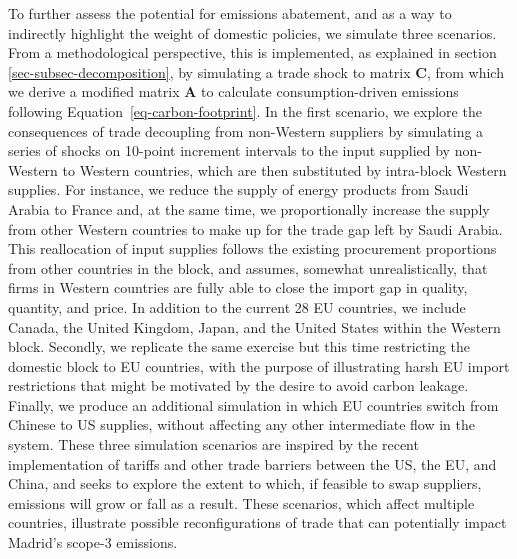 \documentclass[
  10pt,
  twocolumn]{aft}
\begin{document}
To further assess the potential for emissions abatement, and as a way to
indirectly highlight the weight of domestic policies, we simulate three
scenarios. From a methodological perspective, this is implemented, as
explained in section \ref{sec-subsec-decomposition}, by simulating a
trade shock to matrix \(\mathbf{C}\), from which we derive a modified
matrix \(\mathbf{A}\) to calculate consumption-driven emissions
following Equation~\ref{eq-carbon-footprint}. In the first scenario, we
explore the consequences of trade decoupling from non-Western suppliers
by simulating a series of shocks on 10-point increment intervals to the
input supplied by non-Western to Western countries, which are then
substituted by intra-block Western supplies. For instance, we reduce the
supply of energy products from Saudi Arabia to France and, at the same
time, we proportionally increase the supply from other Western countries
to make up for the trade gap left by Saudi Arabia. This reallocation of
input supplies follows the existing procurement proportions from other
countries in the block, and assumes, somewhat unrealistically, that
firms in Western countries are fully able to close the import gap in
quality, quantity, and price. In addition to the current 28 EU
countries, we include Canada, the United Kingdom, Japan, and the United
States within the Western block. Secondly, we replicate the same
exercise but this time restricting the domestic block to EU countries,
with the purpose of illustrating harsh EU import restrictions that might
be motivated by the desire to avoid carbon leakage. Finally, we produce
an additional simulation in which EU countries switch from Chinese to US
supplies, without affecting any other intermediate flow in the system.
These three simulation scenarios are inspired by the recent
implementation of tariffs and other trade barriers between the US, the
EU, and China, and seeks to explore the extent to which, if feasible to
swap suppliers, emissions will grow or fall as a result. These
scenarios, which affect multiple countries, illustrate possible
reconfigurations of trade that can potentially impact Madrid's scope-3
emissions.
\end{document}
